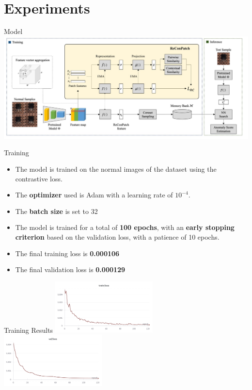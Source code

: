 \documentclass{beamer}
\begin{document}
\section{Experiments}
\begin{frame}{Model}
\includegraphics[width=\textwidth]
{assets/model}
\end{frame}
\begin{frame}{Training}
      \begin{itemize}
              \item The model is trained on the normal images of the dataset 
              using the contrastive loss.
              \item The \textbf{optimizer} used is Adam with a learning rate of $10^{-4}$.
              \item The \textbf{batch size} is set to 32
              \item The model is trained for a total of \textbf{100 epochs}, with an \textbf{early stopping
               criterion} based on the validation loss, with a patience of 10 epochs.
              \item The final training loss is \textbf{0.000106}
              \item The final validation loss is \textbf{0.000129}
              \end{itemize}
              
\end{frame}

\begin{frame}{Training Results}
    \centering
    \includegraphics[width=0.40\textwidth]{assets/train_loss.png}
    \hspace{0.04\textwidth}
    \includegraphics[width=0.40\textwidth]{assets/val_loss.png}
\end{frame}
\end{document}
